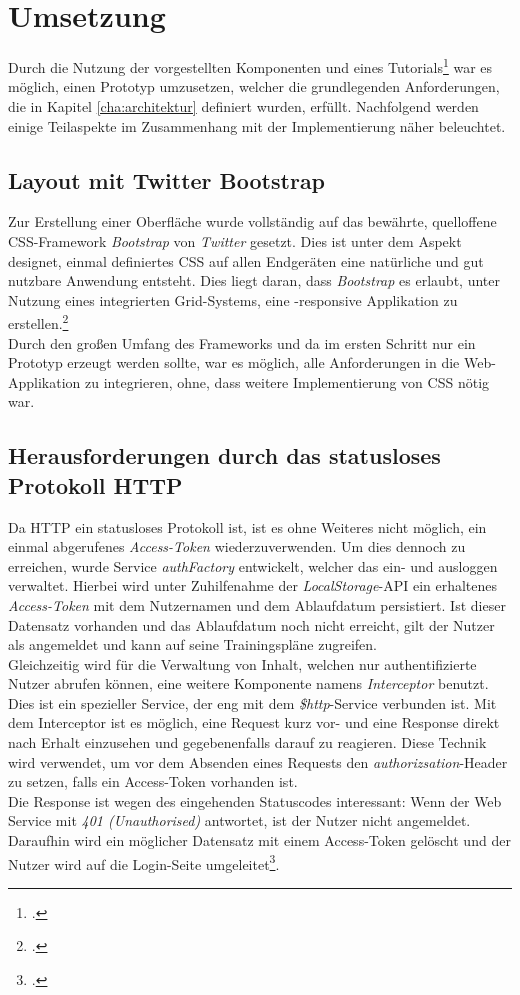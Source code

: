 {\section{Umsetzung}
\label{sec:SPA-Umsetzung}
Durch die Nutzung der vorgestellten Komponenten und eines Tutorials\footcite{online:Created_SPA} war es möglich, einen Prototyp umzusetzen, welcher die grundlegenden Anforderungen, die in Kapitel \ref{cha:architektur} definiert wurden, erfüllt. Nachfolgend werden einige Teilaspekte im Zusammenhang mit der Implementierung näher beleuchtet.
\subsection{Layout mit Twitter Bootstrap}
\label{ssec:SPA-twitter-bootstrap}
Zur Erstellung einer Oberfläche wurde vollständig auf das bewährte, quelloffene \ac{CSS}-Framework \textit{Bootstrap} von \textit{Twitter} gesetzt. Dies ist unter dem Aspekt designet, einmal definiertes \ac{CSS} auf allen Endgeräten eine natürliche und gut nutzbare Anwendung entsteht. Dies liegt daran, dass \textit{Bootstrap} es erlaubt, unter Nutzung eines integrierten Grid-Systems, eine -\gls{responsiv}e Applikation zu erstellen.\footcite{online:get-bootstrap}\\
Durch den großen Umfang des Frameworks und da im ersten Schritt nur ein Prototyp erzeugt werden sollte, war es möglich, alle Anforderungen in die Web-Applikation zu integrieren, ohne, dass weitere Implementierung von \ac{CSS} nötig war.

\subsection{Herausforderungen durch das statusloses Protokoll HTTP}
\label{ssec:statusloses-http}
Da \ac{HTTP} ein statusloses Protokoll ist, ist es ohne Weiteres nicht möglich, ein einmal abgerufenes \textit{Access-Token} wiederzuverwenden. Um dies dennoch zu erreichen, wurde Service \textit{authFactory} entwickelt, welcher  das ein- und ausloggen verwaltet. Hierbei wird unter Zuhilfenahme der \textit{LocalStorage}-\ac{API} ein erhaltenes \textit{Access-Token} mit dem Nutzernamen und dem Ablaufdatum persistiert. Ist dieser Datensatz vorhanden und das Ablaufdatum noch nicht erreicht, gilt der Nutzer als angemeldet und kann auf seine Trainingspläne zugreifen. \\
Gleichzeitig wird für die Verwaltung von Inhalt, welchen nur authentifizierte Nutzer abrufen können, eine weitere Komponente namens \textit{Interceptor} benutzt. Dies ist ein spezieller Service, der eng mit dem \textit{\$http}-Service verbunden ist. Mit dem Interceptor ist es möglich, eine Request kurz vor- und eine Response direkt nach Erhalt einzusehen und gegebenenfalls darauf zu reagieren. Diese Technik wird verwendet, um vor dem Absenden eines Requests den \textit{authorizsation}-Header zu setzen, falls ein Access-Token vorhanden ist. \\ 
Die Response ist wegen des eingehenden Statuscodes interessant: Wenn der Web Service mit \textit{401 (Unauthorised)} antwortet, ist der Nutzer nicht angemeldet. Daraufhin wird ein möglicher Datensatz mit einem Access-Token gelöscht und der Nutzer wird auf die Login-Seite umgeleitet\footcite{online:Created_SPA}. 

}
